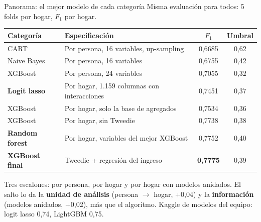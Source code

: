 \documentclass[aspectratio=169,10pt,xcolor=table]{beamer}
\begin{document}
\begin{frame}{Panorama: el mejor modelo de cada categoría}
\small
Misma evaluación para todos: 5 folds por hogar, $F_1$ por hogar.
\vspace{2mm}

\footnotesize
\setlength{\tabcolsep}{6pt}
\begin{tabular}{@{}llcc@{}}
\toprule
Categoría & Especificación & $F_1$ & Umbral \\
\midrule
CART & Por persona, 16 variables, up-sampling & 0,6685 & 0,62 \\
Naive Bayes & Por persona, 16 variables & 0,6755 & 0,42 \\
XGBoost & Por persona, 24 variables & 0,7055 & 0,32 \\
\midrule
\textcolor{clogit}{\textbf{Logit lasso}} & Por hogar, 1.159 columnas con interacciones & 0,7451 & 0,37 \\
XGBoost & Por hogar, solo la base de agregados & 0,7534 & 0,36 \\
\midrule
XGBoost & Por hogar, sin Tweedie & 0,7738 & 0,38 \\
\textcolor{crf}{\textbf{Random forest}} & Por hogar, variables del mejor XGBoost & 0,7752 & 0,40 \\
\textcolor{cxgb}{\textbf{XGBoost final}} & Tweedie + regresión del ingreso & \textbf{0,7775} & 0,39 \\
\bottomrule
\end{tabular}
\vspace{3mm}

\small Tres escalones: por persona, por hogar y por hogar con modelos
anidados. El salto lo da la \textbf{unidad de análisis} (persona $\to$
hogar, +0,04) y la \textbf{información} (modelos anidados, +0,02), más que el
algoritmo. Kaggle de modelos del equipo: logit lasso 0,74, LightGBM 0,75.
\end{frame}
\end{document}
